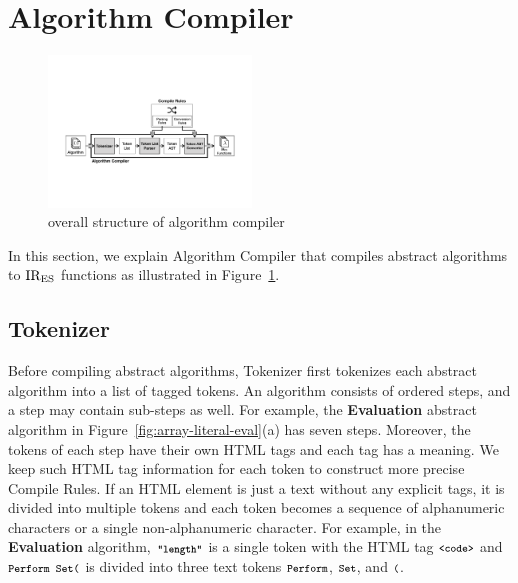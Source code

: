 \section{Algorithm Compiler}\label{sec:compiler}
\begin{figure}
  \centering
  \includegraphics[width=0.48\textwidth]{img/algo-compiler.pdf}
  \caption{overall structure of {\sf algorithm compiler}}
  \label{fig:algo-compiler}
\end{figure}

In this section, we explain {\sf Algorithm Compiler} that compiles
abstract algorithms to \( \text{IR}_\text{ES} \) functions as illustrated in
Figure~\ref{fig:algo-compiler}.

\subsection{Tokenizer}
Before compiling abstract algorithms, {\sf Tokenizer} first tokenizes each
abstract algorithm into a list of tagged tokens.  An algorithm consists of
ordered steps, and a step may contain sub-steps as well.  For example, the
\textbf{\small Evaluation} abstract algorithm in
Figure~\ref{fig:array-literal-eval}(a) has seven steps.  Moreover, the tokens of
each step have their own HTML tags and each tag has a meaning.  We keep such
HTML tag information for each token to construct more precise {\sf Compile
Rules}. If an HTML element is just a text without any explicit tags, it is
divided into multiple tokens and each token becomes a sequence of alphanumeric
characters or a single non-alphanumeric character.  For example, in the
\textbf{\small Evaluation} algorithm, \( \textbf{\texttt{\footnotesize"length"}} \) is a single
token with the HTML tag \( \texttt{\footnotesize<code>} \) and \( \texttt{\footnotesize Perform Set(} \) is
divided into three text tokens \( \texttt{\footnotesize Perform} \), \( \texttt{\footnotesize Set} \), and \(
\texttt{\footnotesize(} \).

